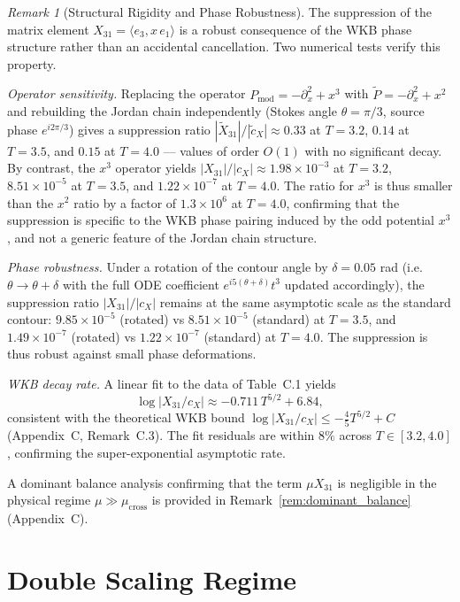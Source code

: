 \documentclass[12pt,a4paper]{amsart}
\theoremstyle{remark}
\newtheorem{remark}[theorem]{Remark}
\begin{document}
\begin{remark}[Structural Rigidity and Phase Robustness]
The suppression of the matrix element $X_{31} = \langle e_3, x\, e_1 \rangle$ is a robust
consequence of the WKB phase structure rather than an accidental cancellation.
Two numerical tests verify this property.

\emph{Operator sensitivity.}
Replacing the operator $P_{\mathrm{mod}} = -\partial_x^2 + x^3$ with
$\tilde{P} = -\partial_x^2 + x^2$ and rebuilding the Jordan chain independently
(Stokes angle $\theta = \pi/3$, source phase $e^{i2\pi/3}$) gives a suppression
ratio $|\tilde{X}_{31}|/|\tilde{c}_X| \approx 0.33$ at $T = 3.2$,
$0.14$ at $T = 3.5$, and $0.15$ at $T = 4.0$ --- values of order $O(1)$ with no
significant decay. By contrast, the $x^3$ operator yields
$|X_{31}|/|c_X| \approx 1.98\times10^{-3}$ at $T=3.2$,
$8.51\times10^{-5}$ at $T=3.5$, and $1.22\times10^{-7}$ at $T=4.0$.
The ratio for $x^3$ is thus smaller than the $x^2$ ratio by a factor of
$1.3\times10^6$ at $T=4.0$, confirming that the suppression is specific to the WKB
phase pairing induced by the odd potential $x^3$, and not a generic feature of the
Jordan chain structure.

\emph{Phase robustness.}
Under a rotation of the contour angle by $\delta = 0.05$ rad
(i.e.\ $\theta \to \theta + \delta$ with the full ODE coefficient
$e^{i5(\theta+\delta)} t^3$ updated accordingly), the suppression ratio
$|X_{31}|/|c_X|$ remains at the same asymptotic scale as the standard contour:
$9.85\times10^{-5}$ (rotated) vs $8.51\times10^{-5}$ (standard) at $T = 3.5$,
and $1.49\times10^{-7}$ (rotated) vs $1.22\times10^{-7}$ (standard) at $T = 4.0$.
The suppression is thus robust against small phase deformations.

\emph{WKB decay rate.}
A linear fit to the data of Table~C.1 yields
\[
  \log|X_{31}/c_X| \approx -0.711\,T^{5/2} + 6.84,
\]
consistent with the theoretical WKB bound
$\log|X_{31}/c_X| \leq -\frac{4}{5}T^{5/2} + C$ (Appendix~C, Remark~C.3).
The fit residuals are within $8\%$ across $T \in [3.2, 4.0]$, confirming
the super-exponential asymptotic rate.

A dominant balance analysis confirming that the term $\mu X_{31}$ is negligible
in the physical regime $\mu \gg \mu_{\mathrm{cross}}$ is provided in
Remark~\ref{rem:dominant_balance} (Appendix~C).
\end{remark}

\section{Double Scaling Regime}
\end{document}
